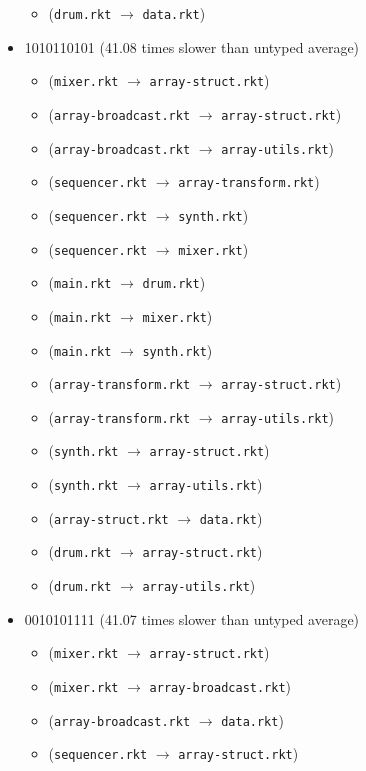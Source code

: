 \documentclass{article}
\newcommand{\mono}[1]{\texttt{#1}}
\begin{document}
\begin{itemize}
\begin{itemize}
  \item (\mono{drum.rkt} $\rightarrow$ \mono{data.rkt})
  \end{itemize}
\item 1010110101 (41.08 times slower than untyped average)
  \begin{itemize}
  \item (\mono{mixer.rkt} $\rightarrow$ \mono{array-struct.rkt})
  \item (\mono{array-broadcast.rkt} $\rightarrow$ \mono{array-struct.rkt})
  \item (\mono{array-broadcast.rkt} $\rightarrow$ \mono{array-utils.rkt})
  \item (\mono{sequencer.rkt} $\rightarrow$ \mono{array-transform.rkt})
  \item (\mono{sequencer.rkt} $\rightarrow$ \mono{synth.rkt})
  \item (\mono{sequencer.rkt} $\rightarrow$ \mono{mixer.rkt})
  \item (\mono{main.rkt} $\rightarrow$ \mono{drum.rkt})
  \item (\mono{main.rkt} $\rightarrow$ \mono{mixer.rkt})
  \item (\mono{main.rkt} $\rightarrow$ \mono{synth.rkt})
  \item (\mono{array-transform.rkt} $\rightarrow$ \mono{array-struct.rkt})
  \item (\mono{array-transform.rkt} $\rightarrow$ \mono{array-utils.rkt})
  \item (\mono{synth.rkt} $\rightarrow$ \mono{array-struct.rkt})
  \item (\mono{synth.rkt} $\rightarrow$ \mono{array-utils.rkt})
  \item (\mono{array-struct.rkt} $\rightarrow$ \mono{data.rkt})
  \item (\mono{drum.rkt} $\rightarrow$ \mono{array-struct.rkt})
  \item (\mono{drum.rkt} $\rightarrow$ \mono{array-utils.rkt})
  \end{itemize}
\item 0010101111 (41.07 times slower than untyped average)
  \begin{itemize}
  \item (\mono{mixer.rkt} $\rightarrow$ \mono{array-struct.rkt})
  \item (\mono{mixer.rkt} $\rightarrow$ \mono{array-broadcast.rkt})
  \item (\mono{array-broadcast.rkt} $\rightarrow$ \mono{data.rkt})
  \item (\mono{sequencer.rkt} $\rightarrow$ \mono{array-struct.rkt})

\end{itemize}
\end{itemize}
\end{document}
